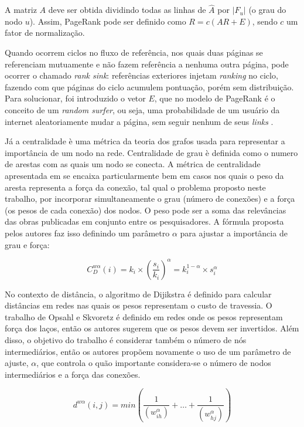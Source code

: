 \documentclass[12pt]{article}
\begin{document}
A matriz $A$ deve ser obtida dividindo todas as linhas de $\hat{A}$ por $|F_u|$ (o grau do nodo $u$). Assim, PageRank pode ser definido como $R = c(AR + E)$, sendo $c$ um fator de normalização.

Quando ocorrem ciclos no fluxo de referência, nos quais duas páginas se referenciam mutuamente e não fazem referência a nenhuma outra página, pode ocorrer o chamado \textit{rank sink}: referências exteriores injetam \textit{ranking} no ciclo, fazendo com que páginas do ciclo acumulem pontuação, porém sem distribuição. Para solucionar, foi introduzido o vetor $E$, que no modelo de PageRank é o conceito de um \textit{random surfer}, ou seja, uma probabilidade de um usuário da internet aleatoriamente mudar a página, sem seguir nenhum de seus \textit{links} \cite{page1999pagerank}.

Já a centralidade è uma métrica da teoria dos grafos usada para representar a importância de um nodo na rede. Centralidade de grau è definida como o numero de arestas com as quais um nodo se conecta. A métrica de centralidade apresentada em \cite{opsahl2010node} se encaixa particularmente bem em casos nos quais o peso da aresta representa a força da conexão, tal qual o problema proposto neste trabalho, por incorporar simultaneamente o grau (número de conexões) e a força (os pesos de cada conexão) dos nodos. O peso pode ser a soma das relevâncias das obras publicadas em conjunto entre os pesquisadores. A fórmula proposta pelos autores faz isso definindo um parâmetro $\alpha$ para ajustar a importância de grau e força:

\begin{equation} \label{eqn:centrality} 
 C_D ^{w \alpha} (i) = k_i \times \left( \frac {s_i} {k_i} \right) ^{\alpha} = k_i ^{1 - \alpha} \times s _i ^{\alpha}
\end{equation}

No contexto de distância, o algoritmo de Dijikstra \cite{dijkstra1959note} é definido para calcular distâncias em redes nas quais os pesos representam o custo de travessia. O trabalho de Opsahl e Skvoretz \cite{opsahl2010node} é definido em redes onde os pesos representam força dos laços, então os autores sugerem que os pesos devem ser invertidos. Além disso, o objetivo do trabalho é considerar também o número de nós intermediários, então os autores propõem novamente o uso de um parâmetro de ajuste, $\alpha$, que controla o quão importante considera-se o número de nodos intermediários e a força das conexões.

\begin{equation} \label{eqn:distance}
  d^{w\alpha}(i, j) = min \left( \frac{1}{ \left( w_{ih}^{\alpha} \right) } + \dots + \frac{1}{ \left( w_{hj}^{\alpha} \right) }  \right) 
\end{equation}
\end{document}
